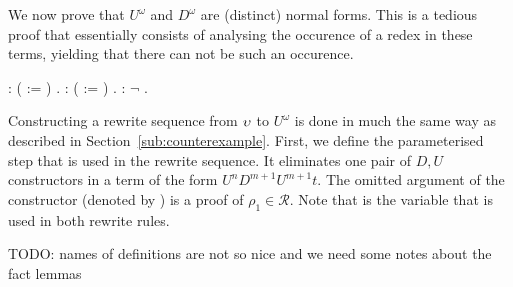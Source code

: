 We now prove that $U^\omega$ and $D^\omega$ are (distinct) normal
forms. This is a tedious proof that essentially consists of analysing
the occurence of a redex in these terms, yielding that there can not
be such an occurence.
\begin{singlespace}
\begin{coqdoccode}
\coqdocnoindent
{}  :
( :=
)
.\coqdoceol
\coqdocemptyline
\coqdocnoindent
{}  :
( :=
)
.\coqdoceol
\coqdocemptyline
\coqdocnoindent
{}
 :
\ensuremath{\lnot}
.\coqdoceol
\end{coqdoccode}
\end{singlespace}

Constructing a rewrite sequence from $\upsilon$ to $U^\omega$ is done in
much the same way as described in
Section~\ref{sub:counterexample}. First, we define the parameterised
step that is used in the rewrite sequence. It eliminates one pair of $D,
U$ constructors in a term of the form $U^n D^{m+1} U^{m+1} t$. The
omitted argument of the 
constructor (denoted by \coqdoclemma{\_}) is a proof of $\rho_1 \in
\mathcal{R}$. Note that  is the variable that is
used in both rewrite rules.

TODO: names of definitions are not so nice and we need some notes
about the fact lemmas

